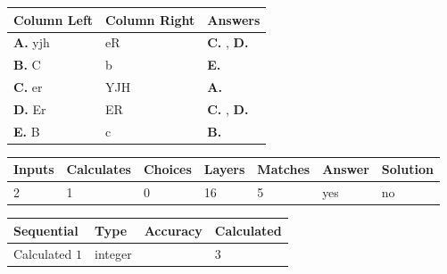 \documentclass[12pt]{article}
\begin{document}
  
 
 
\noindent{}
  
  
\begin{tabular}{|l|l|l|}
 \hline
 Column Left & Column Right  & Answers       \\ 
 \hline
{\textbf{\large{
A.}}}
yjh
  & 
eR
 & 
{\textbf{\large{
C.}}}
, 
{\textbf{\large{
D.}}}
 \\ 
 \hline
{\textbf{\large{
B.}}}
C
  & 
b
 & 
{\textbf{\large{
E.}}}
 \\ 
 \hline
{\textbf{\large{
C.}}}
er
  & 
YJH
 & 
{\textbf{\large{
A.}}}
 \\ 
 \hline
{\textbf{\large{
D.}}}
Er
  & 
ER
 & 
{\textbf{\large{
C.}}}
, 
{\textbf{\large{
D.}}}
 \\ 
 \hline
{\textbf{\large{
E.}}}
B
  & 
c
 & 
{\textbf{\large{
B.}}}
 \\ 
 \hline
 \end{tabular}
  
  
 
 
\noindent{}
 
 
 
   
   
   
   
\noindent\begin{tabular}{|l|l|l|l|l|l|l|}
 \hline
Inputs & Calculates & Choices & Layers & Matches & Answer & Solution \\ \hline
           2 & 
           1 & 
           0
  & 
          16 & 
           5 & 
  yes & 
  no 
  \\ \hline
 \end{tabular}
   
   
   
   
\noindent{}
   
   
  
  
\noindent\begin{tabular}{|l|l|l|l|}
\hline
 Sequential & Type & Accuracy & Calculated \\ 
\hline
 
 
  Calculated $           1$ & integer &  & 
  $ 3 $ 
 \\  \hline  
 \end{tabular}
   
   
   
\end{document}
